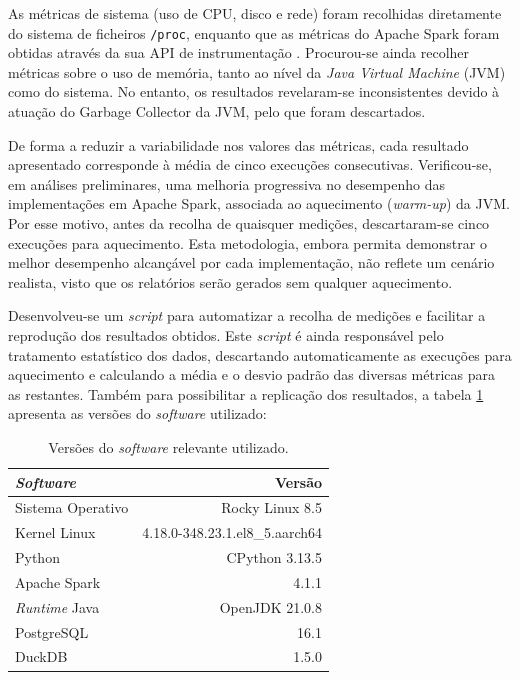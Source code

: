 \documentclass[11pt, a4paper]{article}
\begin{document}
As métricas de sistema (uso de CPU, disco e rede) foram recolhidas diretamente do sistema de
ficheiros \texttt{/proc}, enquanto que as métricas do Apache Spark foram obtidas através da sua API
de instrumentação \cite{spark-instrumentation}. Procurou-se ainda recolher métricas sobre o uso de
memória, tanto ao nível da \emph{Java Virtual Machine} (JVM) como do sistema. No entanto, os
resultados revelaram-se inconsistentes devido à atuação do Garbage Collector da JVM, pelo que foram
descartados.

De forma a reduzir a variabilidade nos valores das métricas, cada resultado apresentado corresponde
à média de cinco execuções consecutivas. Verificou-se, em análises preliminares, uma melhoria
progressiva no desempenho das implementações em Apache Spark, associada ao aquecimento
(\emph{warm-up}) da JVM. Por esse motivo, antes da recolha de quaisquer medições, descartaram-se
cinco execuções para aquecimento. Esta metodologia, embora permita demonstrar o melhor desempenho
alcançável por cada implementação, não reflete um cenário realista, visto que os relatórios serão
gerados sem qualquer aquecimento.

Desenvolveu-se um \emph{script} para automatizar a recolha de medições e facilitar a reprodução dos
resultados obtidos. Este \emph{script} é ainda responsável pelo tratamento estatístico dos dados,
descartando automaticamente as execuções para aquecimento e calculando a média e o desvio padrão
das diversas métricas para as restantes. Também para possibilitar a replicação dos resultados, a
tabela \ref{software-versions} apresenta as versões do \emph{software} utilizado:

\begin{table}[H]
    \centering
    \begin{tabular}{@{}|l|r|}
        \hline
        \textbf{\emph{Software}} & \textbf{Versão} \\
        \hline

        Sistema Operativo   & Rocky Linux 8.5                \\ \hline
        Kernel Linux        & 4.18.0-348.23.1.el8\_5.aarch64 \\ \hline
        Python              & CPython 3.13.5                 \\ \hline
        Apache Spark        & 4.1.1                          \\ \hline
        \emph{Runtime} Java & OpenJDK 21.0.8                 \\ \hline
        PostgreSQL          & 16.1                           \\ \hline
        DuckDB              & 1.5.0                          \\ \hline
    \end{tabular}

    \caption{Versões do \emph{software} relevante utilizado.}
    \label{software-versions}
\end{table}
\end{document}
